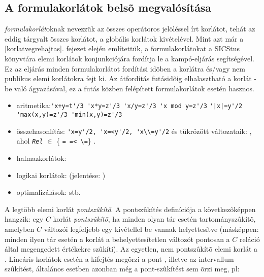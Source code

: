 \subsection{A formulakorlátok belsõ megvalósítása}
\label{korlatkif}

 \emph{formulakorlát}oknak nevezzük az összes operátoros
jelöléssel írt korlátot, tehát az eddig tárgyalt összes korlátot, a
globális korlátok kivételével.
\br
Mint azt már a \ref{korlatvegrehajtas}. fejezet elején említettük, a
formulakorlátokat a SICStus \clpfd könyvtára elemi korlátok konjunkciójára
fordítja le a  kampó-eljárás segítségével. Ez az
eljárás minden formulakorlátot fordítási idõben a 
korlátra és/vagy nem publikus elemi korlátokra fejt ki. Az átfordítás
futásidõig elhalasztható a korlát -be való ágyazásával, ez
a futás közben felépített formulakorlátok esetén hasznos.

\begin{itemize}
\item aritmetika:\verb?'x+y=t'/3 'x*y=z'/3 'x/y=z'/3 'x mod y=z'/3?
\verb?'|x|=y'/2 'max(x,y)=z'/3 'min(x,y)=z'/3?
 \item összehasonlítás: \verb?'x=y'/2, 'x=<y'/2, 'x\\=y'/2?
és tükrözött változataik: ,
ahol {\tt\em Rel} $\in$ \{ \verb?= =< \=?\} .
\item halmazkorlátok: 
\item logikai korlátok:  (jelentése: )
\item optimalizálások:  stb.
\end{itemize}

\label{pontszukites}
A legtöbb elemi korlát \emph{pontszûkítõ}. A pontszûkítés definíciója
a következõképpen hangzik: egy $C$ korlát \emph{pontszûkítõ}, ha minden
olyan tár esetén tartományszûkítõ, amelyben $C$ változói legfeljebb
egy kivétellel be vannak helyettesítve (másképpen: minden ilyen tár esetén
a korlát a behelyettesítetlen változót pontosan a $C$ reláció által
megengedett értékekre szûkíti). Az egyetlen, nem pontszûkítõ elemi
korlát a .
\br
Lineáris korlátok esetén a kifejtés megõrzi a pont-, illetve az
intervallum-szûkítést, általános esetben azonban még a pont-szûkítést
sem õrzi meg, pl:

